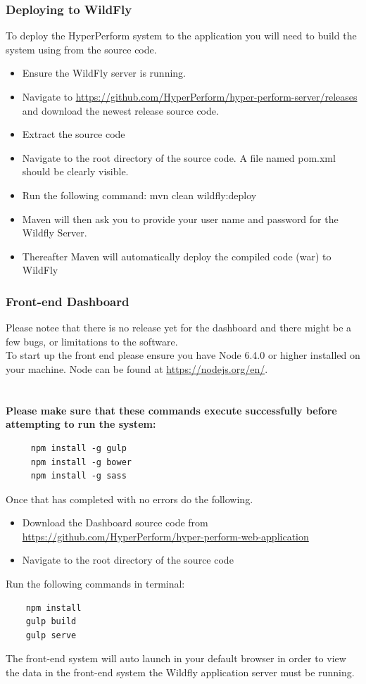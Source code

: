 \documentclass[11pt,a4paper]{article}
\begin{document}
\subsubsection{Deploying to WildFly}
To deploy the HyperPerform system to the application you will need to build the system using from the source code. 

\begin{itemize}
	\item Ensure the WildFly server is running.
	\item Navigate to \url{https://github.com/HyperPerform/hyper-perform-server/releases} and download the newest release source code.
	\item Extract the source code
	\item Navigate to the root directory of the source code. A file named pom.xml should be clearly visible.
	\item Run the following command: mvn clean wildfly:deploy
	\item Maven will then ask you to provide your user name and password for the Wildfly Server.
	\item Thereafter Maven will automatically deploy the compiled code (war) to WildFly
\end{itemize}



\subsubsection{Front-end Dashboard}
Please notee that there is no release yet for the dashboard and there might be a few bugs, or limitations to the software.\\
To start up the front end please ensure you have Node 6.4.0 or higher installed on your machine. Node can be found at \url{https://nodejs.org/en/}. \\\\\\
\noindent
\textbf{Please make sure that these commands execute successfully before attempting to run the system:}
\begin{lstlisting}
	 npm install -g gulp
	 npm install -g bower
	 npm install -g sass
\end{lstlisting}
Once that has completed with no errors do the following.
\begin{itemize}
	\item Download the Dashboard source code from \url{https://github.com/HyperPerform/hyper-perform-web-application}
	\item Navigate to the root directory of the source code
\end{itemize}
Run the following commands in terminal: 
\begin{lstlisting}	
	npm install
	gulp build
	gulp serve
\end{lstlisting}
\noindent
The front-end system will auto launch in your default browser in order to view the data in the front-end system the Wildfly application server must be running.
\end{document}

